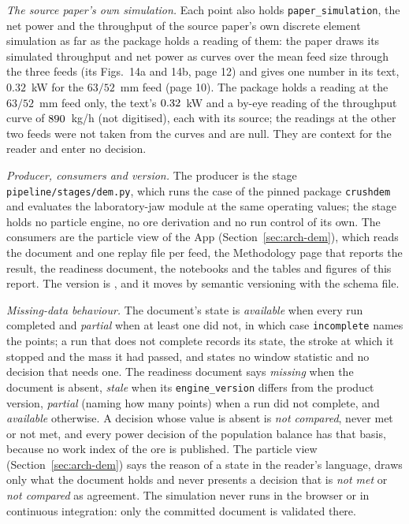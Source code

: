 \emph{The source paper's own simulation.} Each point also holds \texttt{paper\_simulation}, the net power and the throughput of the source paper's own discrete element simulation as far as the package holds a reading of them: the paper draws its simulated throughput and net power as curves over the mean feed size through the three feeds (its Figs.~14a and 14b, page 12) and gives one number in its text, $0.32$~kW for the $63/52$~mm feed (page 10). The package holds a reading at the $63/52$~mm feed only, the text's $0.32$~kW and a by-eye reading of the throughput curve of $890$~kg/h (not digitised), each with its source; the readings at the other two feeds were not taken from the curves and are null. They are context for the reader and enter no decision.

\emph{Producer, consumers and version.} The producer is the stage \texttt{pipeline/\allowbreak{}stages/\allowbreak{}dem.py}, which runs the case of the pinned package \texttt{crushdem} and evaluates the laboratory-jaw module at the same operating values; the stage holds no particle engine, no ore derivation and no run control of its own. The consumers are the particle view of the App (Section~\ref{sec:arch-dem}), which reads the document and one replay file per feed, the Methodology page that reports the result, the readiness document, the notebooks and the tables and figures of this report. The version is , and it moves by semantic versioning with the schema file.

\emph{Missing-data behaviour.} The document's state is \emph{available} when every run completed and \emph{partial} when at least one did not, in which case \texttt{incomplete} names the points; a run that does not complete records its state, the stroke at which it stopped and the mass it had passed, and states no window statistic and no decision that needs one. The readiness document says \emph{missing} when the document is absent, \emph{stale} when its \texttt{engine\_version} differs from the product version, \emph{partial} (naming how many points) when a run did not complete, and \emph{available} otherwise. A decision whose value is absent is \emph{not compared}, never met or not met, and every power decision of the population balance has that basis, because no work index of the ore is published. The particle view (Section~\ref{sec:arch-dem}) says the reason of a state in the reader's language, draws only what the document holds and never presents a decision that is \emph{not met} or \emph{not compared} as agreement. The simulation never runs in the browser or in continuous integration: only the committed document is validated there.


